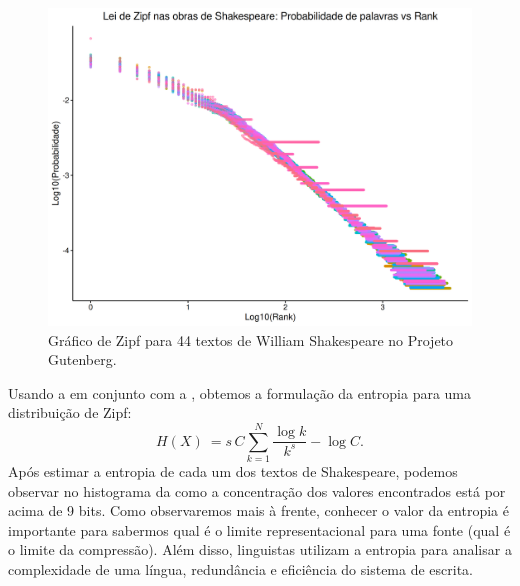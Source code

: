 \begin{figure}%
    \includegraphics[width=\linewidth]{figures/zipf_plot.png}
    \caption{Gráfico de Zipf para 44 textos de William Shakespeare no Projeto Gutenberg.}
    \label{fig:zipfshakespeare}
\end{figure}


Usando a  em conjunto com a , obtemos a
formulação da entropia para uma distribuição de Zipf:
\begin{equation}\label{eq:zipf-entropy}
H(X) \: = s \, C \sum_{k=1}^{N} \frac{\log k}{k^s} - \log C .
\end{equation}
Após estimar a entropia de cada um dos textos de Shakespeare, podemos observar
no histograma da  como a concentração dos valores
encontrados está por acima de 9 bits. Como observaremos mais à frente, conhecer
o valor da entropia é importante para sabermos qual é o limite representacional
para uma fonte (qual é o limite da compressão). Além disso, linguistas utilizam
a entropia para analisar a complexidade de uma língua, redundância e eficiência
do sistema de escrita.

